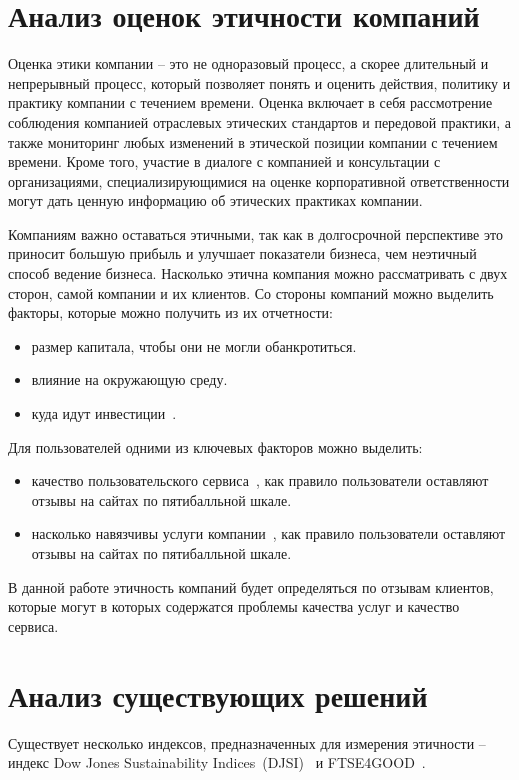 \documentclass[PI, VKR]{HSEUniversity}
\begin{document}
\section{Анализ оценок этичности компаний}
\label{sec:orgd5dfd21}
Оценка этики компании -- это не одноразовый процесс, а скорее длительный и непрерывный процесс, который позволяет понять и оценить действия, политику и практику компании с течением времени. Оценка включает в себя рассмотрение соблюдения компанией отраслевых этических стандартов и передовой практики, а также мониторинг любых изменений в этической позиции компании с течением времени. Кроме того, участие в диалоге с компанией и консультации с организациями, специализирующимися на оценке корпоративной ответственности могут дать ценную информацию об этических практиках компании.

Компаниям важно оставаться этичными, так как в долгосрочной перспективе это приносит большую прибыль и улучшает показатели бизнеса, чем неэтичный способ ведение бизнеса\autocites{climent_ethical_2018}[][]{mure_esg_2021}. Насколько этична компания можно рассматривать с двух сторон, самой компании и их клиентов. Со стороны компаний можно выделить факторы, которые можно получить из их отчетности:
\begin{itemize}
\item размер капитала, чтобы они не могли обанкротиться.
\item влияние на окружающую среду.
\item куда идут инвестиции~\autocite{harvey_ethical_1995}.
\end{itemize}
Для пользователей одними из ключевых факторов можно выделить:
\begin{itemize}
\item качество пользовательского сервиса~\autocite{brunk_exploring_2010}, как правило пользователи оставляют отзывы на сайтах по пятибалльной шкале.
\item насколько навязчивы услуги компании~\autocite{mitchell_bank_1992}, как правило пользователи оставляют отзывы на сайтах по пятибалльной шкале.
\end{itemize}

В данной работе этичность компаний будет определяться по отзывам клиентов, которые могут в которых содержатся проблемы качества услуг и качество сервиса.
\section{Анализ существующих решений}
\label{sec:org603d51a}
Существует несколько индексов, предназначенных для измерения этичности -- индекс Dow Jones Sustainability Indices~(DJSI)~\autocite{lopez_sustainable_2007} и FTSE4GOOD~\autocite{collison_financial_2008}.
\end{document}
